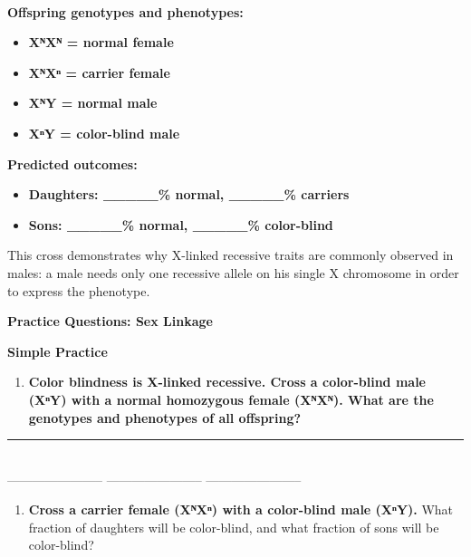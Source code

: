 \documentclass[
  letterpaper,
  DIV=11,
  numbers=noendperiod]{scrreprt}
\providecommand{\tightlist}{%
  \setlength{\itemsep}{0pt}\setlength{\parskip}{0pt}}
\begin{document}
\textbf{~~~~~~~}

\textbf{Offspring genotypes and phenotypes:}

\begin{itemize}
\item
  \textbf{XᴺXᴺ = normal female}
\item
  \textbf{XᴺXⁿ = carrier female}
\item
  \textbf{XᴺY = normal male}
\item
  \textbf{XⁿY = color-blind male}
\end{itemize}

\textbf{Predicted outcomes:}

\begin{itemize}
\item
  \textbf{Daughters: \_\_\_\_\_\% normal, \_\_\_\_\_\% carriers}
\item
  \textbf{Sons: \_\_\_\_\_\% normal, \_\_\_\_\_\% color-blind}
\end{itemize}

This cross demonstrates why X-linked recessive traits are commonly
observed in males: a male needs only one recessive allele on his single
X chromosome in order to express the phenotype.

\textbf{Practice Questions: Sex Linkage}

\textbf{Simple Practice}

\begin{enumerate}
\def\labelenumi{\arabic{enumi}.}
\tightlist
\item
  \textbf{Color blindness is X-linked recessive. Cross a color-blind
  male (XⁿY) with a normal homozygous female (XᴺXᴺ). What are the
  genotypes and phenotypes of all offspring?}
\end{enumerate}

\begin{center}\rule{0.5\linewidth}{0.5pt}\end{center}

\textbf{~~}\\
----------------------- ----------------------- -----------------------

\begin{enumerate}
\def\labelenumi{\arabic{enumi}.}
\setcounter{enumi}{1}
\tightlist
\item
  \textbf{Cross a carrier female (XᴺXⁿ) with a color-blind male (XⁿY).}
  What fraction of daughters will be color-blind, and what fraction of
  sons will be color-blind?
\end{enumerate}
\end{document}
